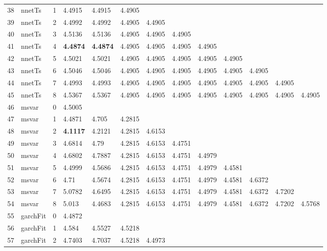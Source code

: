 \documentclass[10pt,a4paper]{article}
\begin{document}
\begin{table}[ht]
\begin{tabular}{rlrllllllllll}
  38 & nnetTs &     1 & 4.4915 & 4.4915 & 4.4905 &  &  &  &  &  &  &  \\ 
  39 & nnetTs &     2 & 4.4992 & 4.4992 & 4.4905 & 4.4905 &  &  &  &  &  &  \\ 
  40 & nnetTs &     3 & 4.5136 & 4.5136 & 4.4905 & 4.4905 & 4.4905 &  &  &  &  &  \\ 
  41 & nnetTs &     4 & \textbf{4.4874} & \textbf{4.4874} & 4.4905 & 4.4905 & 4.4905 & 4.4905 &  &  &  &  \\ 
  42 & nnetTs &     5 & 4.5021 & 4.5021 & 4.4905 & 4.4905 & 4.4905 & 4.4905 & 4.4905 &  &  &  \\ 
  43 & nnetTs &     6 & 4.5046 & 4.5046 & 4.4905 & 4.4905 & 4.4905 & 4.4905 & 4.4905 & 4.4905 &  &  \\ 
  44 & nnetTs &     7 & 4.4993 & 4.4993 & 4.4905 & 4.4905 & 4.4905 & 4.4905 & 4.4905 & 4.4905 & 4.4905 &  \\ 
  45 & nnetTs &     8 & 4.5367 & 4.5367 & 4.4905 & 4.4905 & 4.4905 & 4.4905 & 4.4905 & 4.4905 & 4.4905 & 4.4905 \\ 
   \hline
46 & msvar &     0 & 4.5005 &  &  &  &  &  &  &  &  &  \\ 
  47 & msvar &     1 & 4.4871 & 4.705 & 4.2815 &  &  &  &  &  &  &  \\ 
  48 & msvar &     2 & \textbf{4.1117} & 4.2121 & 4.2815 & 4.6153 &  &  &  &  &  &  \\ 
  49 & msvar &     3 & 4.6814 & 4.79 & 4.2815 & 4.6153 & 4.4751 &  &  &  &  &  \\ 
  50 & msvar &     4 & 4.6802 & 4.7887 & 4.2815 & 4.6153 & 4.4751 & 4.4979 &  &  &  &  \\ 
  51 & msvar &     5 & 4.4999 & 4.5686 & 4.2815 & 4.6153 & 4.4751 & 4.4979 & 4.4581 &  &  &  \\ 
  52 & msvar &     6 & 4.71 & 4.5674 & 4.2815 & 4.6153 & 4.4751 & 4.4979 & 4.4581 & 4.6372 &  &  \\ 
  53 & msvar &     7 & 5.0782 & 4.6495 & 4.2815 & 4.6153 & 4.4751 & 4.4979 & 4.4581 & 4.6372 & 4.7202 &  \\ 
  54 & msvar &     8 & 5.013 & 4.4683 & 4.2815 & 4.6153 & 4.4751 & 4.4979 & 4.4581 & 4.6372 & 4.7202 & 4.5768 \\ 
   \hline
55 & garchFit &     0 & 4.4872 &  &  &  &  &  &  &  &  &  \\ 
  56 & garchFit &     1 & 4.584 & 4.5527 & 4.5218 &  &  &  &  &  &  &  \\ 
  57 & garchFit &     2 & 4.7403 & 4.7037 & 4.5218 & 4.4973 &  &  &  &  &  &  \\ 

\end{tabular}
\end{table}
\end{document}
